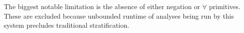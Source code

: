 \documentclass{article}
\begin{document}
The biggest notable limitation is the absence of either negation or $\forall$ primitives.
These are excluded because unbounded runtime of analyses being run by this system precludes traditional stratification.

\end{document}
